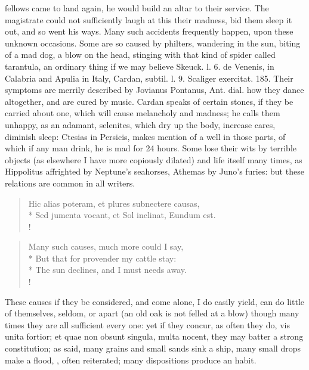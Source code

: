 {fellows came to land again, he would build an altar to their
service. The magistrate could not sufficiently laugh at this their
madness, bid them sleep it out, and so went his ways. Many such
accidents frequently happen, upon these unknown occasions. Some are so
caused by philters, wandering in the sun, biting of a mad dog, a blow
on the head, stinging with that kind of spider called tarantula, an
ordinary thing if we may believe Skeuck. l. 6. de Venenis, in Calabria
and Apulia in Italy, Cardan, subtil. l. 9. Scaliger exercitat. 185.
Their symptoms are merrily described by Jovianus Pontanus, Ant. dial.
how they dance altogether, and are cured by music. Cardan speaks
of certain stones, if they be carried about one, which will cause
melancholy and madness; he calls them unhappy, as an adamant,
selenites, \etc{} which dry up the body, increase cares, diminish sleep:
Ctesias in Persicis, makes mention of a well in those parts, of which
if any man drink, he is mad for 24 hours. Some lose their wits by
terrible objects (as elsewhere I have more copiously dilated) and
life itself many times, as Hippolitus affrighted by Neptune's
seahorses, Athemas by Juno's furies: but these relations are common in
all writers.
%
\begin{latin}%
\begin{verse}%
Hic alias poteram, et plures subnectere causas,\\*
Sed jumenta vocant, et Sol inclinat, Eundum est.\\!
\end{verse}%
\end{latin}%
\translationrule%
\begin{verse}%
Many such causes, much more could I say,\\*
But that for provender my cattle stay:\\*
The sun declines, and I must needs away.\\!
\end{verse}%
%

These causes if they be considered, and come alone, I do easily yield,
can do little of themselves, seldom, or apart (an old oak is not felled
at a blow) though many times they are all sufficient every one: yet if
they concur, as often they do, vis unita fortior; et quae non obsunt
singula, multa nocent, they may batter a strong constitution; as
\Austin{} said, many grains and small sands sink a ship, many small
drops make a flood, \etc{}, often reiterated; many dispositions produce an
habit.

}
